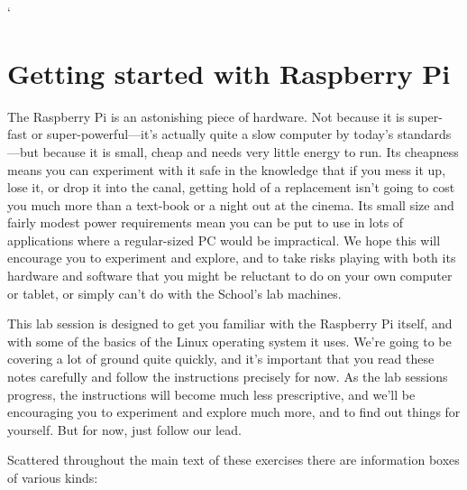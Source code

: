 ` \chapter{Getting started with Raspberry Pi}


The Raspberry Pi is an astonishing piece of hardware. Not because it is super-fast or super-powerful---it's actually quite a slow computer by today's standards---but because it is small, cheap and needs very little energy to run. Its cheapness means you can experiment with it safe in the knowledge that if you mess it up, lose it, or drop it into the canal, getting hold of a replacement isn't going to cost you much more than a text-book or a night out at the cinema. Its small size and fairly modest power requirements mean you can be put to use in lots of applications where a regular-sized PC would be impractical.  We hope this will encourage you to experiment and explore, and to take risks playing with both its hardware and software that you might be reluctant to do on your own computer or tablet, or simply can't do with the School's lab machines. 

This lab session is designed to get you familiar with the Raspberry Pi itself, and with some of the basics of the Linux operating system it uses. We're going to be covering a lot of ground quite quickly, and it's important that you read these notes carefully and follow the instructions precisely for now. As the lab sessions progress, the instructions will become much less prescriptive, and we'll be encouraging you to experiment and explore much more, and to find out things for yourself. But for now, just follow our lead. 

Scattered throughout the main text of these exercises there are information boxes of various kinds:
\\

